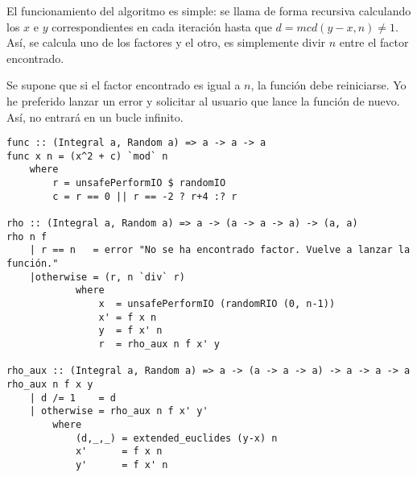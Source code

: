 \documentclass[10pt,spanish]{article}
\begin{document}
El funcionamiento del algoritmo es simple: se llama de forma recursiva calculando los $x$ e $y$ correspondientes en cada iteración hasta que $d = mcd(y - x, n) \neq 1$. Así, se calcula uno de los factores y el otro, es simplemente divir $n$ entre el factor encontrado.

Se supone que si el factor encontrado es igual a $n$, la función debe reiniciarse. Yo he preferido lanzar un error y solicitar al usuario que lance la función de nuevo. Así, no entrará en un bucle infinito.

\begin{verbatim}
func :: (Integral a, Random a) => a -> a -> a
func x n = (x^2 + c) `mod` n
    where
        r = unsafePerformIO $ randomIO
        c = r == 0 || r == -2 ? r+4 :? r

rho :: (Integral a, Random a) => a -> (a -> a -> a) -> (a, a)
rho n f
    | r == n   = error "No se ha encontrado factor. Vuelve a lanzar la función."
    |otherwise = (r, n `div` r)
            where
                x  = unsafePerformIO (randomRIO (0, n-1))
                x' = f x n 
                y  = f x' n
                r  = rho_aux n f x' y

rho_aux :: (Integral a, Random a) => a -> (a -> a -> a) -> a -> a -> a
rho_aux n f x y
    | d /= 1    = d
    | otherwise = rho_aux n f x' y'
        where
            (d,_,_) = extended_euclides (y-x) n
            x'      = f x n
            y'      = f x' n
\end{verbatim}
\end{document}

